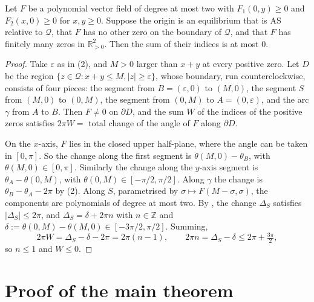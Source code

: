 \documentclass[11pt,a4paper]{report}
\providecommand{\R}{\mathbb{R}}
\newcommand{\Q}{\mathcal{Q}}
\begin{document}
\begin{theorem}\label{thm:index}
Let \(F\) be a polynomial vector field of degree at most two with \(F_1(0,y)\ge0\) and \(F_2(x,0)\ge0\) for
\(x,y\ge0\). Suppose the origin is an equilibrium that is AS relative to \(\Q\), that \(F\) has no other zero on the
boundary of \(\Q\), and that \(F\) has finitely many zeros in \(\R^2_{>0}\). Then the sum of their indices is at most
\(0\).
\end{theorem}

\begin{proof}
Take \(\varepsilon\) as in (2), and \(M>0\) larger than \(x+y\) at every positive zero. Let \(D\) be
the region \(\{z\in\Q:x+y\le M,|z|\ge\varepsilon\}\), whose boundary, run counterclockwise, consists of four pieces:
the segment from \(B=(\varepsilon,0)\) to \((M,0)\), the segment \(S\) from \((M,0)\) to \((0,M)\), the segment from
\((0,M)\) to \(A=(0,\varepsilon)\), and the arc \(\gamma\) from \(A\) to \(B\). Then \(F\neq0\) on \(\partial D\), and
the sum \(W\) of the indices of the positive zeros satisfies \(2\pi W=\) total change of the angle of \(F\) along
\(\partial D\).

On the \(x\)-axis, \(F\) lies in the closed upper half-plane, where the angle can be taken in \([0,\pi]\). So the
change along the first segment is \(\theta(M,0)-\theta_B\), with \(\theta(M,0)\in[0,\pi]\). Similarly the change
along the \(y\)-axis segment is \(\theta_A-\theta(0,M)\), with \(\theta(0,M)\in[-\pi/2,\pi/2]\). Along \(\gamma\) the
change is \(\theta_B-\theta_A-2\pi\) by (2). Along \(S\), parametrised by \(\sigma\mapsto
F(M-\sigma,\sigma)\), the components are polynomials of degree at most two. By , the change
\(\Delta_S\) satisfies \(|\Delta_S|\le2\pi\), and \(\Delta_S=\delta+2\pi n\) with \(n\in\mathbb Z\) and
\(\delta:=\theta(0,M)-\theta(M,0)\in[-3\pi/2,\pi/2]\). Summing,
\[
2\pi W=\Delta_S-\delta-2\pi=2\pi(n-1),\qquad 2\pi n=\Delta_S-\delta\le2\pi+\tfrac{3\pi}{2},
\]
so \(n\le1\) and \(W\le0\).
\end{proof}

\section{Proof of the main theorem}
\end{document}
